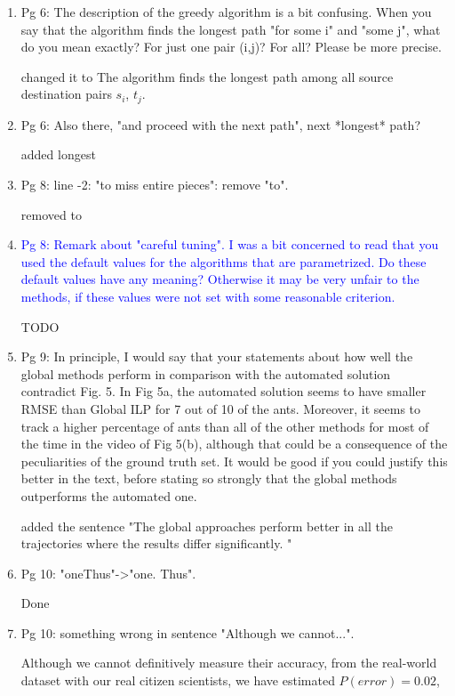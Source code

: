 \documentclass[12pt]{article}
\begin{document}
\begin{enumerate}
\item Pg 6: The description of the greedy algorithm is a bit confusing. When you say that the algorithm finds the longest path "for some i" and "some j", what do you mean exactly? For just one pair (i,j)? For all? Please be more precise.

changed it to The algorithm finds the longest path among all source destination pairs $s_i$, $t_j$.

\item Pg 6: Also there, "and proceed with the next path", next *longest* path?

added longest

\item Pg 8: line -2: "to miss entire pieces": remove "to".

removed to

\item \textcolor{blue}{Pg 8: Remark about "careful tuning". I was a bit concerned to read that you used the default values for the algorithms that are parametrized. Do these default values have any meaning? Otherwise it may be very unfair to the methods, if these values were not set with some reasonable criterion.
}

TODO 
\item {Pg 9: In principle, I would say that your statements about how well the global methods perform in comparison with the automated solution contradict Fig. 5. In Fig 5a, the automated solution seems to have smaller RMSE than Global ILP for 7 out of 10 of the ants. Moreover, it seems to track a higher percentage of ants than all of the other methods for most of the time in the video of Fig 5(b), although that could be a consequence of the peculiarities of the ground truth set. It would be good if you could justify this better in the text, before stating so strongly that the global methods outperforms the automated one.
}

added the sentence "The global approaches perform better in all the trajectories where the results differ
significantly.
"

\item Pg 10: "oneThus"->"one. Thus".

Done

\item Pg 10: something wrong in sentence "Although we cannot...".

Although we cannot definitively measure their accuracy,
from the real-world dataset with
our real citizen scientists, we have estimated $P(error)=0.02$, 



\end{enumerate}
\end{document}
